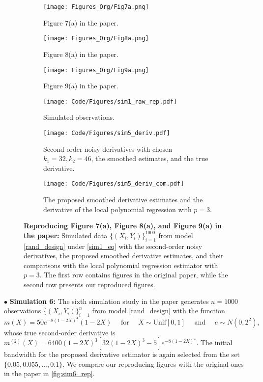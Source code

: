 \documentclass{uwstat572}
\theoremstyle{definition}
\theoremstyle{theorem}
\begin{document}
\begin{figure}[!t]
	\captionsetup[subfigure]{justification=centering}
	\begin{subfigure}[t]{0.32\linewidth}
		\centering
		\texttt{[image: Figures\_Org/Fig7a.png]}
		\caption{Figure 7(a) in the paper.}
	\end{subfigure}
	\hfil
	\begin{subfigure}[t]{0.32\linewidth}
		\centering
		\texttt{[image: Figures\_Org/Fig8a.png]}
		\caption{Figure 8(a) in the paper.}
	\end{subfigure}
	\hfil
	\begin{subfigure}[t]{0.32\linewidth}
		\centering
		\texttt{[image: Figures\_Org/Fig9a.png]}
		\caption{Figure 9(a) in the paper.}
	\end{subfigure}
	\begin{subfigure}[t]{0.32\linewidth}
		\centering
		\texttt{[image: Code/Figures/sim1\_raw\_rep.pdf]}
		\caption{Simulated observations.}
	\end{subfigure}
	\hfil
	\begin{subfigure}[t]{0.32\linewidth}
		\centering
		\texttt{[image: Code/Figures/sim5\_deriv.pdf]}
		\caption{Second-order noisy derivatives with chosen $k_1=32, k_2=46$, the smoothed estimates, and the true derivative.}
	\end{subfigure}
	\hfil
	\begin{subfigure}[t]{0.32\linewidth}
		\centering
		\texttt{[image: Code/Figures/sim5\_deriv\_com.pdf]}
		\caption{The proposed smoothed derivative estimates and the derivative of the local polynomial regression with $p=3$.}
	\end{subfigure}
	\caption{{\bf Reproducing Figure 7(a), Figure 8(a), and Figure 9(a) in the paper:} Simulated data $\{(X_i,Y_i)\}_{i=1}^{1000}$ from model \eqref{rand_design} under \eqref{sim1_eq} with the second-order noisy derivatives, the proposed smoothed derivative estimates, and their comparisons with the local polynomial regression estimator with $p=3$. The first row contains figures in the original paper, while the second row presents our reproduced figures.}
	\label{fig:sim5_rep}
\end{figure}


$\bullet$ {\bf Simulation 6:} The sixth simulation study in the paper \citep{liu2020smoothed} generates $n=1000$ observations $\{(X_i,Y_i)\}_{i=1}^n$ from model \eqref{rand_design} with the function
\begin{equation}
\label{sim6_eq}
m(X) = 50e^{-8(1-2X)^4} (1-2X)\quad \text{ for } \quad X\sim \mathrm{Unif}[0,1] \quad \text{ and } \quad e\sim N(0,2^2),
\end{equation}
whose true second-order derivative is $m^{(2)}(X)=6400(1-2X)^3\left[32(1-2X)^3 -5\right] e^{-8(1-2X)^4}$. The initial bandwidth for the proposed derivative estimator is again selected from the set $\{0.05, 0.055,...,0.1\}$. We compare our reproducing figures with the original ones in the paper in \autoref{fig:sim6_rep}.
\end{document}
